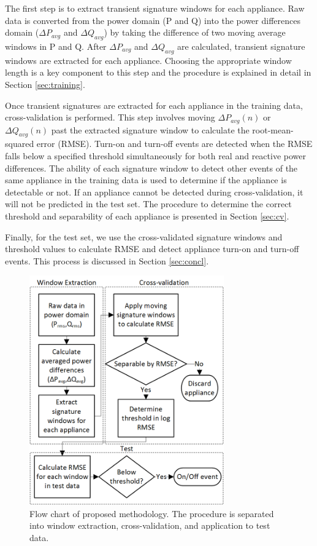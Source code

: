\documentclass[conference]{IEEEtran}
\begin{document}
The first step is to extract transient signature windows for each appliance.  Raw data is converted from the power domain (P and Q) into the power differences domain ($\Delta P_{avg}$ and $\Delta Q_{avg}$) by taking the difference of two moving average windows in P and Q.  After $\Delta P_{avg}$ and $\Delta Q_{avg}$ are calculated, transient signature windows are extracted for each appliance.  Choosing the appropriate window length is a key component to this step and the procedure is explained in detail in Section \ref{sec:training}. 

Once transient signatures are extracted for each appliance in the training data, cross-validation is performed.  This step involves moving  $\Delta P_{avg}(n)$ or $\Delta Q_{avg}(n)$ past the extracted signature window to calculate the root-mean-squared error (RMSE).  Turn-on and turn-off events are detected when the RMSE falls below a specified threshold simultaneously for both real and reactive power differences.  The ability of each signature window to detect other events of the same appliance in the training data is used to determine if the appliance is detectable or not.  If an appliance cannot be detected during cross-validation, it will not be predicted in the test set.  The procedure to determine the correct threshold and separability of each appliance is presented in Section \ref{sec:cv}.  

Finally, for the test set, we use the cross-validated signature windows and threshold values to calculate RMSE and detect appliance turn-on and turn-off events.  This process is discussed in Section \ref{sec:concl}.  

\begin{figure}[!t]
	\centering
	\includegraphics[width=3.3in]{fig/flow.png}
	\caption{Flow chart of proposed methodology.  The procedure is separated into window extraction, cross-validation, and application to test data.}
	\label{fig:flow}
\end{figure}
\end{document}
